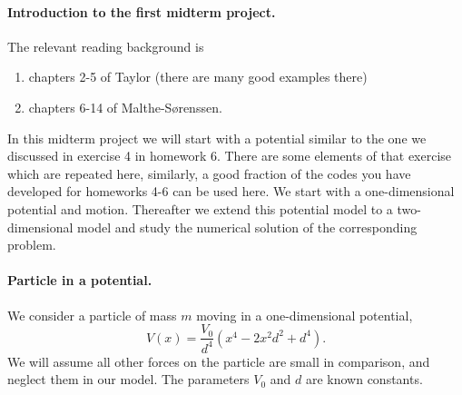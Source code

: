 \documentclass[%
oneside,                 %
final,                   %
10pt]{article}
\begin{document}
\noindent
\paragraph{Introduction to the first midterm project.}
The relevant reading background is
\begin{enumerate}
\item chapters 2-5 of Taylor (there are many good examples there)

\item chapters 6-14 of Malthe-Sørenssen.
\end{enumerate}

\noindent
In this midterm project we will start with a potential similar to the
one we discussed in exercise 4 in homework 6. There are some elements
of that exercise which are repeated here, similarly, a good fraction
of the codes you have developed for homeworks 4-6 can be used here.
We start with a one-dimensional potential and motion.  Thereafter we
extend this potential model to a two-dimensional model and study the
numerical solution of the corresponding problem.

\paragraph{Particle in a  potential.}
We consider a particle of mass $m$ moving in a one-dimensional potential,
\[
V(x)=\frac{V_0}{d^4}\left(x^4-2x^2d^2+d^4\right).
\]
We will assume all other forces on the particle are small in comparison, and neglect them in our model.  The parameters $V_0$ and $d$ are known constants. 
\end{document}
